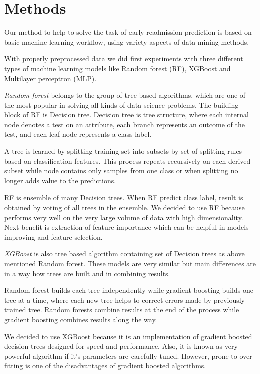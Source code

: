 \documentclass[runningheads]{llncs}
\begin{document}
\section{Methods}

Our method to help to solve the task of early readmission prediction is based on basic machine learning workflow, using variety aspects of data mining methods.

With properly preprocessed data we did first experiments with three different types of machine learning  models like Random forest (RF), XGBoost and Multilayer perceptron (MLP).

\emph{Random forest} belongs to the group of tree based algorithms, which are one of the most popular in solving all kinds of data science problems. The building block of RF is Decision tree. Decision tree is tree structure, where each internal node denotes a test on an attribute, each branch represents an outcome of the test, and each leaf node represents a class label. 

A tree is learned by splitting training set into subsets by set of splitting rules based on classification features. This process repeats recursively on each derived subset while node contains only samples from one class or when splitting no longer adds value to the predictions. 

RF is  ensemble of many Decision trees. When RF predict class label, result is obtained by voting of all trees in the ensemble. We decided to use RF because  performs very well on the very large volume of data with high dimensionality. Next benefit is extraction of feature importance which can be helpful in models improving and feature selection.  

\emph{XGBoost} is also tree based algorithm containing set of Decision trees as above mentioned  Random forest. These models are very similar but main differences are in a way how trees are built and in combining results.

Random forest builds each tree independently while gradient boosting builds one tree at a time, where each new tree helps to correct errors made by previously trained tree. Random forests combine results at the end of the process while gradient boosting combines results along the way.

We decided to use XGBoost because it is an implementation of gradient boosted decision trees designed for speed and performance. Also, it is known as very powerful algorithm if it's parameters are carefully tuned. However, prone to over-fitting is one of the disadvantages of gradient boosted algorithms.
\end{document}
